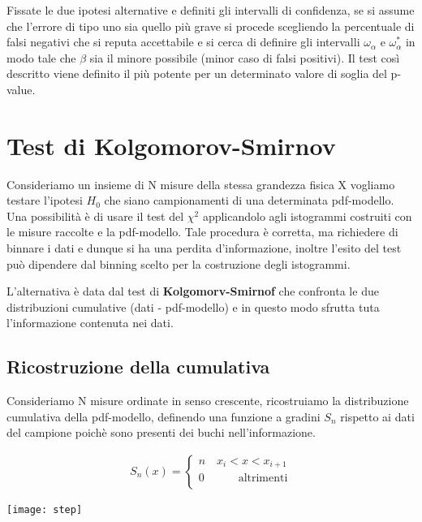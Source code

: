 \documentclass[11pt,a4paper]{book}
\begin{document}
\noindent Fissate le due ipotesi alternative e definiti gli intervalli di confidenza, se si assume che l'errore di tipo uno sia quello pi\`{u} grave si procede scegliendo la percentuale di falsi negativi che si reputa accettabile e si cerca di definire gli intervalli $\omega_\alpha$ e $\omega_\alpha^*$ in modo tale che $\beta$ sia il minore possibile (minor caso di falsi positivi). Il test cos\`{i} descritto viene definito il pi\`{u} potente per un determinato valore di soglia del p-value.

\section{Test di Kolgomorov-Smirnov}

Consideriamo un insieme di N misure della stessa grandezza fisica X vogliamo testare l'ipotesi $H_0$ che siano campionamenti di una determinata pdf-modello. Una possibilit\`{a} \`{e} di usare il test del $\chi^2$ applicandolo agli istogrammi costruiti con le misure raccolte e la pdf-modello. Tale procedura \`{e} corretta, ma richiedere di binnare i dati e dunque si ha una perdita d'informazione, inoltre l'esito del test pu\`{o} dipendere dal binning scelto per la costruzione degli istogrammi.

L'alternativa \`{e} data dal test di \textbf{Kolgomorv-Smirnof} che confronta le due distribuzioni cumulative (dati - pdf-modello) e in questo modo sfrutta tuta l'informazione contenuta nei dati.


\subsection{Ricostruzione della cumulativa}

Consideriamo N misure ordinate in senso crescente, ricostruiamo la distribuzione cumulativa della pdf-modello, definendo una funzione a gradini $S_n$ rispetto ai dati del campione poich\`{e} sono presenti dei buchi nell'informazione.
\vspace{0.2in}

\begin{minipage}{.4\textwidth}
	\begin{align*}
S_n(x) = 
	\begin{cases}
	n \quad x_i < x < x_{i+1} \\
	0 \quad \quad \quad \text{altrimenti}\\
	\end{cases}
\end{align*}
  \end{minipage}
  \begin{minipage}{.4\textwidth}
    \centering
    \texttt{[image: step]}	
  \end{minipage}
\vspace{0.2in}
\end{document}
